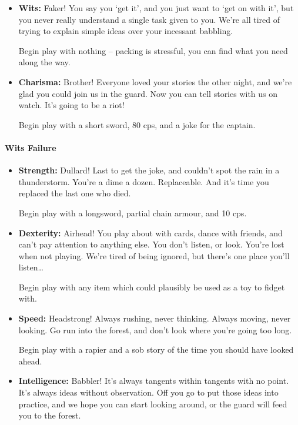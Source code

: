 {\begin{multicols}{2}
\begin{itemize}
  Begin play with a longsword, partial chain armour, and a reason you don't need to listen to people who think they're clever.

  \item
  \textbf{Wits:}
  Faker!
  You say you `get it', and you just want to `get on with it', but you never really understand a single task given to you.
  We're all tired of trying to explain simple ideas over your incessant babbling.

  Begin play with nothing -- packing is stressful, you can find what you need along the way.
  \item
  \textbf{Charisma:}
  Brother!
  Everyone loved your stories the other night, and we're glad you could join us in the \gls{guard}.
  Now you can tell stories with us on watch.
  It's going to be a riot!

  Begin play with a short sword, 80 \glspl{cp}, and a joke for the captain.

\end{itemize}

\paragraph{Wits Failure}
\begin{itemize}

  \item
  \textbf{Strength:}
  Dullard!
  Last to get the joke, and couldn't spot the rain in a thunderstorm.
  You're a dime a dozen.
  Replaceable.
  And it's time you replaced the last one who died.

  Begin play with a longsword, partial chain armour, and 10 \glspl{cp}.
  \item
  \textbf{Dexterity:}
  Airhead!
  You play about with cards, dance with friends, and can't pay attention to anything else.
  You don't listen, or look.
  You're lost when not playing.
  We're tired of being ignored, but there's one place you'll listen\ldots

  Begin play with any item which could plausibly be used as a toy to fidget with.
  \item
  \textbf{Speed:}
  Headstrong!
  Always rushing, never thinking.
  Always moving, never looking.
  Go run into the forest, and don't look where you're going too long.

  Begin play with a rapier and a sob story of the time you should have looked ahead.
  \item
  \textbf{Intelligence:}
  Babbler!
  It's always tangents within tangents with no point.
  It's always ideas without observation.
  Off you go to put those ideas into practice, and we hope you can start looking around, or the \gls{guard} will feed you to the forest.


\end{itemize}
\end{multicols}}
